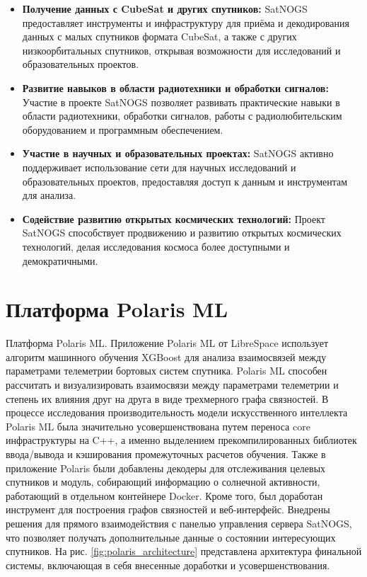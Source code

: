 \documentclass[12pt, a4paper]{extreport}
\begin{document}
\begin{itemize}
\item \textbf{Получение данных с CubeSat и других спутников:} SatNOGS предоставляет инструменты и инфраструктуру для приёма и декодирования данных с малых спутников формата CubeSat, а также с других низкоорбитальных спутников,  открывая возможности для исследований и образовательных проектов.
\item \textbf{Развитие навыков в области радиотехники и обработки сигналов:} Участие в проекте SatNOGS позволяет развивать практические навыки в области радиотехники, обработки сигналов,  работы с радиолюбительским оборудованием и программным обеспечением.
\item \textbf{Участие в научных и образовательных проектах:}  SatNOGS  активно поддерживает использование сети для научных исследований и образовательных проектов,  предоставляя доступ к данным и инструментам для анализа. 
\item \textbf{Содействие развитию открытых космических технологий:} Проект SatNOGS способствует продвижению и развитию открытых космических технологий, делая исследования космоса более доступными и демократичными.
\end{itemize}

\newpage

\section{Платформа Polaris ML}

Платформа Polaris ML. Приложение Polaris ML от LibreSpace использует алгоритм машинного обучения XGBoost для анализа взаимосвязей между параметрами телеметрии бортовых систем спутника. Polaris ML способен рассчитать и визуализировать взаимосвязи между параметрами телеметрии и степень их влияния друг на друга в виде трехмерного графа связностей. В процессе исследования производительность модели искусственного интеллекта Polaris ML была значительно усовершенствована путем переноса core инфраструктуры на C++, а именно выделением прекомпилированных библиотек ввода/вывода и кэширования промежуточных расчетов обучения. Также в приложение Polaris были добавлены декодеры для отслеживания целевых спутников и модуль, собирающий информацию о солнечной активности, работающий в отдельном контейнере Docker. Кроме того, был доработан инструмент для построения графов связностей и веб-интерфейс. Внедрены решения для прямого взаимодействия с панелью управления сервера SatNOGS, что позволяет получать дополнительные данные о состоянии интересующих спутников.
На рис. \ref{fig:polaris_architecture} представлена архитектура финальной системы, включающая в себя внесенные доработки и усовершенствования.
\end{document}
